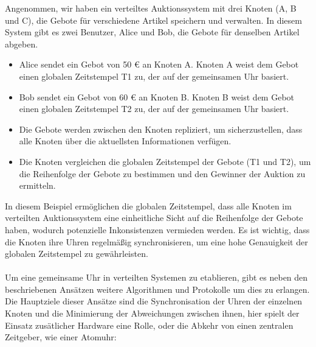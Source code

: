 Angenommen, wir haben ein verteiltes Auktionssystem mit drei Knoten (A, B und C), die Gebote für verschiedene Artikel speichern und verwalten. In diesem System gibt es zwei Benutzer, Alice und Bob, die Gebote für denselben Artikel abgeben.
\begin{itemize}
\item Alice sendet ein Gebot von 50 € an Knoten A. Knoten A weist dem Gebot einen globalen Zeitstempel T1 zu, der auf der gemeinsamen Uhr basiert.
\item Bob sendet ein Gebot von 60 € an Knoten B. Knoten B weist dem Gebot einen globalen Zeitstempel T2 zu, der auf der gemeinsamen Uhr basiert.
\item Die Gebote werden zwischen den Knoten repliziert, um sicherzustellen, dass alle Knoten über die aktuellsten Informationen verfügen.
\item Die Knoten vergleichen die globalen Zeitstempel der Gebote (T1 und T2), um die Reihenfolge der Gebote zu bestimmen und den Gewinner der Auktion zu ermitteln.
\end{itemize}
In diesem Beispiel ermöglichen die globalen Zeitstempel, dass alle Knoten im verteilten Auktionssystem eine einheitliche Sicht auf die Reihenfolge der Gebote haben, wodurch potenzielle Inkonsistenzen vermieden werden. Es ist wichtig, dass die Knoten ihre Uhren regelmäßig synchronisieren, um eine hohe Genauigkeit der globalen Zeitstempel zu gewährleisten.
\\\\
Um eine gemeinsame Uhr in verteilten Systemen zu etablieren, gibt es neben den beschriebenen Ansätzen weitere Algorithmen und Protokolle um dies zu erlangen. Die Hauptziele dieser Ansätze sind die Synchronisation der Uhren der einzelnen Knoten und die Minimierung der Abweichungen zwischen ihnen, hier spielt der Einsatz zusätlicher Hardware eine Rolle, oder die Abkehr von einen zentralen Zeitgeber, wie einer Atomuhr:
